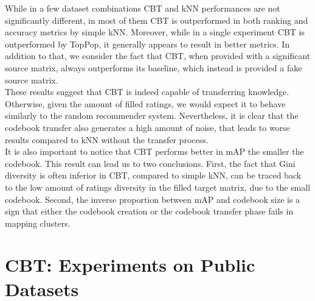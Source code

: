 While in a few dataset combinations CBT and kNN performances are not significantly different, in most of them CBT is outperformed in both ranking and accuracy metrics by simple kNN. Moreover, while in a single experiment CBT is outperformed by TopPop, it generally appears to result in better metrics. In addition to that, we consider the fact that CBT, when provided with a significant source matrix, always outperforms its baseline, which instead is provided a fake source matrix.\\
These results suggest that CBT is indeed capable of transferring knowledge. Otherwise, given the amount of filled ratings, we would expect it to behave similarly to the random recommender system. Nevertheless, it is clear that the codebook transfer also generates a high amount of noise, that leads to worse results compared to kNN without the transfer process.\\
It is also important to notice that CBT performs better in mAP the smaller the codebook. This result can lead us to two conclusions. First, the fact that Gini diversity is often inferior in CBT, compared to simple kNN, can be traced back to the low amount of ratings diversity in the filled target matrix, due to the small codebook. Second, the inverse proportion between mAP and codebook size is a sign that either the codebook creation or the codebook transfer phase fails in mapping clusters.

\clearpage



\section{CBT: Experiments on Public Datasets}

